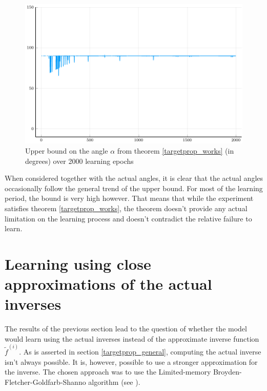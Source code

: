 \begin{figure}
	\centering
	\includegraphics[width=\textwidth]{images/relu-angle-bound/angle-bound.pdf}
	\caption{Upper bound on the angle \( \alpha \) from theorem \ref{targetprop_works} (in degrees) over 2000 learning epochs}\label{angle-bound}
\end{figure}

When considered together with the actual angles, it is clear that the actual angles occasionally follow the general trend of the upper bound. For most of the learning period, the bound is very high however. That means that while the experiment satisfies theorem \ref{targetprop_works}, the theorem doesn't provide any actual limitation on the learning process and doesn't contradict the relative failure to learn.

\section{Learning using close approximations of the actual inverses}
The results of the previous section lead to the question of whether the model would learn using the actual inverses instead of the approximate inverse function \( \widetilde{f}^{(i)} \). As is asserted in section \ref{targetprop_general}, computing the actual inverse isn't always possible. It is, however, possible to use a stronger approximation for the inverse. The chosen approach was to use the Limited-memory Broyden-Fletcher-Goldfarb-Shanno algorithm (see \cite{liu_limited_1989}).


